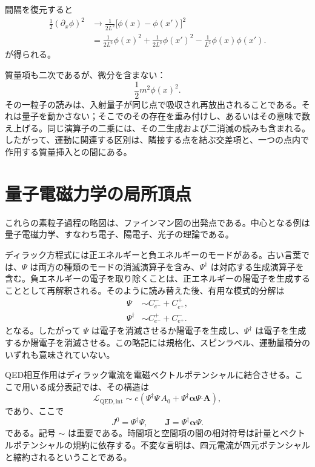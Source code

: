 \begin{classroomqa}
\end{classroomqa}

間隔を復元すると
\begin{align}
\frac12(\partial_x\phi)^2
&\longrightarrow
\frac{1}{2L^2}\bigl[\phi(x)-\phi(x')\bigr]^2
\\
&=
\frac{1}{2L^2}\phi(x)^2
+\frac{1}{2L^2}\phi(x')^2
-\frac{1}{L^2}\phi(x)\phi(x').
\end{align}
が得られる。

質量項も二次であるが、微分を含まない：
\begin{equation}
\frac12m^2\phi(x)^2.
\end{equation}
その一粒子の読みは、入射量子が同じ点で吸収され再放出されることである。それは量子を動かさない；そこでのその存在を重み付けし、あるいはその意味で数え上げる。同じ演算子の二乗には、その二生成および二消滅の読みも含まれる。したがって、運動に関連する区別は、隣接する点を結ぶ交差項と、一つの点内で作用する質量挿入との間にある。

\section{量子電磁力学の局所頂点}

これらの素粒子過程の略図は、ファインマン図の出発点である。中心となる例は量子電磁力学、すなわち電子、陽電子、光子の理論である。

ディラック方程式には正エネルギーと負エネルギーのモードがある。古い言葉では、\(\Psi\) は両方の種類のモードの消滅演算子を含み、\(\Psi^\dagger\) は対応する生成演算子を含む。負エネルギーの電子を取り除くことは、正エネルギーの陽電子を生成することとして再解釈される。そのように読み替えた後、有用な模式的分解は
\begin{align}
\Psi
&\sim
C^-_{e^-}+C^+_{e^+},
\\
\Psi^\dagger
&\sim
C^+_{e^-}+C^-_{e^+}.
\end{align}
となる。したがって \(\Psi\) は電子を消滅させるか陽電子を生成し、\(\Psi^\dagger\) は電子を生成するか陽電子を消滅させる。この略記には規格化、スピンラベル、運動量積分のいずれも意味されていない。

QED相互作用はディラック電流を電磁ベクトルポテンシャルに結合させる。ここで用いる成分表記では、その構造は
\begin{equation}
\mathcal L_{\mathrm{QED,int}}
\sim
e\left(
\Psi^\dagger\Psi\,A_0
+
\Psi^\dagger\boldsymbol{\alpha}\Psi\mathbin{\boldsymbol{\cdot}}\mathbf A
\right),
\end{equation}
であり、ここで
\begin{equation}
J^0=\Psi^\dagger\Psi,
\qquad
\mathbf J=\Psi^\dagger\boldsymbol{\alpha}\Psi.
\end{equation}
である。記号 \(\sim\) は重要である。時間項と空間項の間の相対符号は計量とベクトルポテンシャルの規約に依存する。不変な言明は、四元電流が四元ポテンシャルと縮約されるということである。

